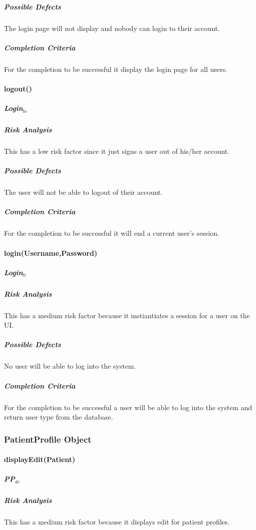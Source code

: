 \documentclass{article}
\begin{document}
\subparagraph{Possible Defects}
The login page will not display and nobody can login to their account.

\subparagraph{Completion Criteria}
For the completion to be successful it display the login page for all users.

\paragraph{logout()}

\subparagraph{Login$_{lo}$}

\subparagraph{Risk Analysis}
This has a low risk factor since it just signs a user out of his/her account.

\subparagraph{Possible Defects}
The user will not be able to logout of their account.

\subparagraph{Completion Criteria}
For the completion to be successful it will end a current user's session.

\paragraph{login(Username,Password)}

\subparagraph{Login$_{li}$}

\subparagraph{Risk Analysis}
This has a medium risk factor because it instiantiates a session for a user on the UI.

\subparagraph{Possible Defects}
No user will be able to log into the system.

\subparagraph{Completion Criteria}
For the completion to be successful a user will be able to log into the system and return user type from the database.


\subsubsection{PatientProfile Object}

\paragraph{displayEdit(Patient)}

\subparagraph{PP$_{de}$}

\subparagraph{Risk Analysis}
This has a medium risk factor because it displays edit for patient profiles.
\end{document}
